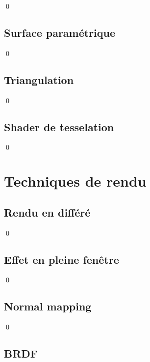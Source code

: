 \documentclass[12pt]{article}
\newcommand{\state}{\noindent}
\begin{document}
\state

\qed

\subsection{Surface paramétrique}

\state

\qed

\subsection{Triangulation}

\state

\qed

\subsection{Shader de tesselation}

\state

\qed


\pagebreak

\section{Techniques de rendu}

\subsection{Rendu en différé}

\state

\qed

\subsection{Effet en pleine fenêtre}

\state

\qed

\subsection{Normal mapping}

\state

\qed

\subsection{BRDF}

\state
\end{document}
